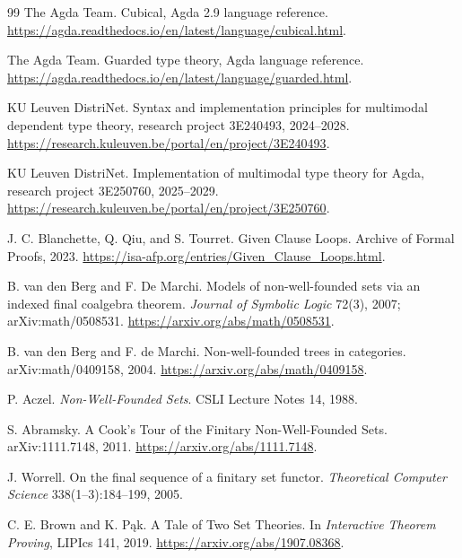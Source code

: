 \documentclass[11pt]{article}
\theoremstyle{definition}
\theoremstyle{remark}
\begin{document}
\begin{thebibliography}{99}
The Agda Team.
\newblock Cubical, Agda 2.9 language reference.
\newblock \url{https://agda.readthedocs.io/en/latest/language/cubical.html}.

The Agda Team.
\newblock Guarded type theory, Agda language reference.
\newblock \url{https://agda.readthedocs.io/en/latest/language/guarded.html}.

KU Leuven DistriNet.
\newblock Syntax and implementation principles for multimodal dependent type
  theory, research project 3E240493, 2024--2028.
\newblock \url{https://research.kuleuven.be/portal/en/project/3E240493}.

KU Leuven DistriNet.
\newblock Implementation of multimodal type theory for Agda, research project
  3E250760, 2025--2029.
\newblock \url{https://research.kuleuven.be/portal/en/project/3E250760}.

J. C. Blanchette, Q. Qiu, and S. Tourret.
\newblock Given Clause Loops.
\newblock Archive of Formal Proofs, 2023.
\newblock \url{https://isa-afp.org/entries/Given_Clause_Loops.html}.

B. van den Berg and F. De Marchi.
\newblock Models of non-well-founded sets via an indexed final coalgebra
  theorem.
\newblock \emph{Journal of Symbolic Logic} 72(3), 2007; arXiv:math/0508531.
\newblock \url{https://arxiv.org/abs/math/0508531}.

B. van den Berg and F. de Marchi.
\newblock Non-well-founded trees in categories.
\newblock arXiv:math/0409158, 2004.
\newblock \url{https://arxiv.org/abs/math/0409158}.

P. Aczel.
\newblock \emph{Non-Well-Founded Sets}.
\newblock CSLI Lecture Notes 14, 1988.

S. Abramsky.
\newblock A Cook's Tour of the Finitary Non-Well-Founded Sets.
\newblock arXiv:1111.7148, 2011.
\newblock \url{https://arxiv.org/abs/1111.7148}.

J. Worrell.
\newblock On the final sequence of a finitary set functor.
\newblock \emph{Theoretical Computer Science} 338(1--3):184--199, 2005.

C. E. Brown and K. P\k{a}k.
\newblock A Tale of Two Set Theories.
\newblock In \emph{Interactive Theorem Proving}, LIPIcs 141, 2019.
\newblock \url{https://arxiv.org/abs/1907.08368}.


\end{thebibliography}
\end{document}
